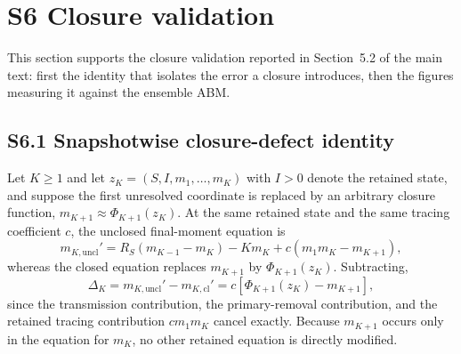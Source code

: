 \documentclass[11pt]{article}
\begin{document}
\section*{S6 Closure validation}
This section supports the closure validation reported in Section~5.2 of the
main text: first the identity that isolates the error a closure introduces,
then the figures measuring it against the ensemble ABM.

\subsection*{S6.1 Snapshotwise closure-defect identity}

Let $K\geq1$ and let $z_K=(S,I,m_1,\ldots,m_K)$ with $I>0$ denote the retained state, and suppose the first unresolved coordinate is replaced by an arbitrary closure function, $m_{K+1}\approx\Phi_{K+1}(z_K)$. At the same retained state and the same tracing coefficient $c$, the unclosed final-moment equation is
\begin{equation}
m_{K,\mathrm{uncl}}' = R_S(m_{K-1}-m_K) - K m_K + c(m_1 m_K - m_{K+1}),
\end{equation}
whereas the closed equation replaces $m_{K+1}$ by $\Phi_{K+1}(z_K)$. Subtracting,
\begin{equation}
\Delta_K = m_{K,\mathrm{uncl}}' - m_{K,\mathrm{cl}}' = c\left[\Phi_{K+1}(z_K) - m_{K+1}\right],
\end{equation}
since the transmission contribution, the primary-removal contribution, and the retained tracing contribution $cm_1m_K$ cancel exactly. Because $m_{K+1}$ occurs only in the equation for $m_K$, no other retained equation is directly modified.
\end{document}
